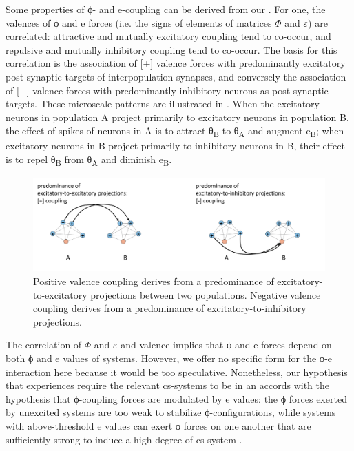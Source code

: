 

  Some properties of ϕ- and e-coupling can be derived from our . For one, the valences of ϕ and e forces (i.e. the signs of elements of matrices $\Phi$ and $\varepsilon $) are correlated: attractive and mutually excitatory coupling tend to co-occur, and repulsive and mutually inhibitory coupling tend to co-occur. The basis for this correlation is the association of [+] valence forces with predominantly excitatory post-synaptic targets of interpopulation synapses, and conversely the association of [−] valence forces with predominantly inhibitory neurons as post-synaptic targets. These microscale patterns are illustrated in {}. When the excitatory neurons in population A project primarily to excitatory neurons in population B, the effect of spikes of neurons in A is to attract θ\textsubscript{B} to θ\textsubscript{A} and augment e\textsubscript{B}; when excitatory neurons in B project primarily to inhibitory neurons in B, their effect is to repel θ\textsubscript{B} from θ\textsubscript{A} and diminish e\textsubscript{B}. 

  
\begin{figure}
\includegraphics[width=\textwidth]{figures/Tilsen-img21.png}
\caption{Positive valence coupling derives from a predominance of excitatory-to-excitatory projections between two populations. Negative valence coupling derives from a predominance of excitatory-to-inhibitory projections.}
\label{fig:2:14}
\end{figure}
 

  The correlation of $\Phi$ and $\varepsilon $ and valence implies that ϕ and e forces depend on both ϕ and e values of systems. However, we offer no specific form for the ϕ-e interaction here because it would be too speculative. Nonetheless, our hypothesis that  experiences require the relevant cs-systems to be in an  accords with the hypothesis that ϕ-coupling forces are modulated by e values: the ϕ forces exerted by unexcited systems are too weak to stabilize ϕ-configurations, while systems with above-threshold e values can exert ϕ forces on one another that are sufficiently strong to induce a high degree of cs-system .

